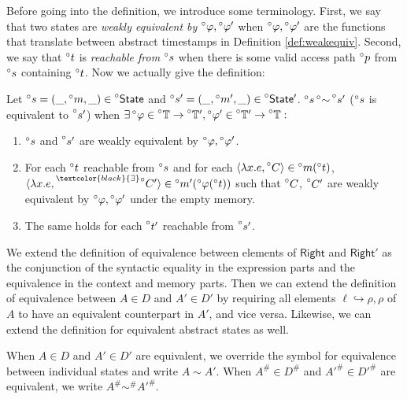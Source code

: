 \documentclass[acmsmall,screen,review]{acmart}\settopmatter{printfolios=true,printccs=false,printacmref=false}
\newcommand*{\prexists}[2][black]{\prescript{\textcolor{#1}{\exists}}{}{#2}}
\newcommand*{\A}[1]{\prescript{\circ}{}{#1}}
\newcommand*{\Abs}[1]{{#1}^{\#}}
\newcommand*{\Time}{\mathbb{T}}
\newcommand*{\ATime}{\A{\Time}}
\newcommand*{\Right}{\mathsf{Right}}
\newcommand*{\mem}{m}
\newcommand*{\AState}{\A{\mathsf{State}}}
\newcommand*{\semarrow}{\hookrightarrow}
\newcommand*{\equivalent}{\sim}
\begin{document}
Before going into the definition, we introduce some terminology.
First, we say that two states are \emph{weakly equivalent by} $\A\varphi,\A\varphi'$ when $\A\varphi,\A\varphi'$ are the functions that translate between abstract timestamps in Definition \ref{def:weakequiv}.
Second, we say that $\A{t}$ is \emph{reachable from} $\A{s}$ when there is some valid access path $\A{p}$ from $\A{s}$ containing $\A{t}$.
Now we actually give the definition:
\begin{definition}
  Let $\A{s}=(\_,\A\mem,\_)\in\AState$ and $\A{s}'=(\_,\A\mem',\_)\in\AState'$.
  $\A{s}\A\equivalent\A{s'}$ ($\A{s}$ is equivalent to $\A{s'}$) when $\exists\A\varphi\in\ATime\rightarrow\ATime',\A\varphi'\in\ATime'\rightarrow\ATime:$
  \begin{enumerate}
    \item $\A{s}$ and $\A{s'}$ are weakly equivalent by $\A\varphi,\A\varphi'$.
    \item For each $\A{t}$ reachable from $\A{s}$ and for each $\langle\lambda x.e,\A{C}\rangle\in\A\mem(\A{t})$, $\langle\lambda x.e,\prexists{\A{C'}}\rangle\in\A\mem'(\A\varphi(\A{t}))$ such that $\A{C}$, $\A{C'}$ are weakly equivalent by $\A\varphi,\A\varphi'$ under the empty memory.
    \item The same holds for each $\A{t'}$ reachable from $\A{s'}$.
  \end{enumerate}
\end{definition}

We extend the definition of equivalence between elements of $\Right$ and $\Right'$ as the conjunction of the syntactic equality in the expression parts and the equivalence in the context and memory parts.
Then we can extend the definition of equivalence between $A\in D$ and $A'\in D'$ by requiring all elements $\ell\semarrow\rho,\rho$ of $A$ to have an equivalent counterpart in $A'$, and vice versa.
Likewise, we can extend the definition for equivalent abstract states as well.

When $A\in D$ and $A'\in D'$ are equivalent, we override the symbol for equivalence between individual states and write $A\equivalent A'$.
When $\Abs{A}\in\Abs{D}$ and $\Abs{A'}\in\Abs{D'}$ are equivalent, we write $\Abs{A}\Abs\equivalent\Abs{A'}$.
\end{document}
